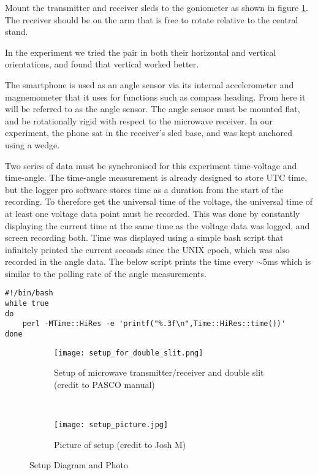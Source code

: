 Mount the transmitter and receiver sleds to the goniometer as shown in figure \ref{fig:goniometer_and_microwaves}. The receiver should be on the arm that is free to rotate relative to the central stand.

In the experiment we tried the pair in both their horizontal and vertical orientations, and found that vertical worked better.

The smartphone is used as an angle sensor via its internal accelerometer and magnemometer that it uses for functions such as compass heading. From here it will be referred to as the angle sensor. The angle sensor must be mounted flat, and be rotationally rigid with respect to the microwave receiver. In our experiment, the phone sat in the receiver's sled base, and was kept anchored using a wedge.

Two series of data must be synchronised for this experiment \textemdash time-voltage and time-angle. The time-angle measurement is already designed to store UTC time, but the logger pro software stores time as a duration from the start of the recording. To therefore get the universal time of the voltage, the universal time of at least one voltage data point must be recorded. This was done by constantly displaying the current time at the same time as the voltage data was logged, and screen recording both. Time was displayed using a simple bash script that infinitely printed the current seconds since the UNIX epoch, which was also recorded in the angle data. The below script prints the time every $\sim$5ms which is similar to the polling rate of the angle measurements.


\begin{verbatim}
#!/bin/bash
while true
do
    perl -MTime::HiRes -e 'printf("%.3f\n",Time::HiRes::time())'
done
\end{verbatim}

\begin{figure}[h]
\centering

\begin{subfigure}[t]{0.5\textwidth}
\texttt{[image: setup\_for\_double\_slit.png]}
\caption{Setup of microwave transmitter/receiver and double slit (credit to PASCO manual)}
\label{fig:goniometer_and_microwaves}

\end{subfigure}
~
\begin{subfigure}[t]{0.4\textwidth}
\texttt{[image: setup\_picture.jpg]}

\caption{Picture of setup (credit to Josh M)}
\label{pic:setup_photo}

\end{subfigure}

\caption{Setup Diagram and Photo}

\end{figure}

